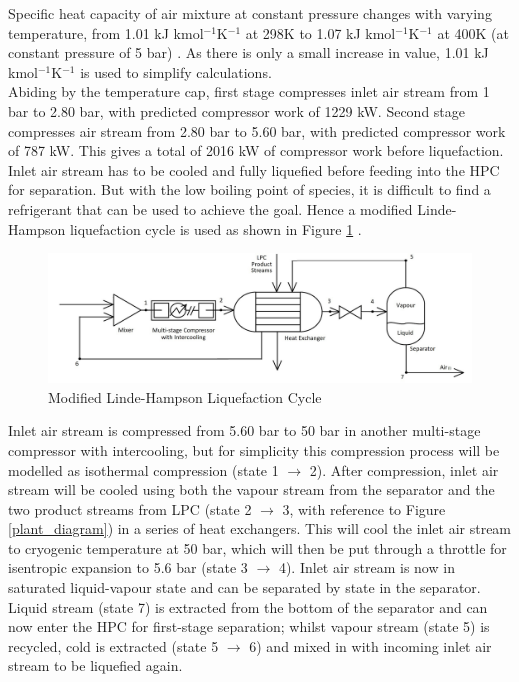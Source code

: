         Specific heat capacity of air mixture at constant pressure changes with varying temperature, from 1.01 kJ kmol$^{-1}$K$^{-1}$ at 298K to 1.07 kJ kmol$^{-1}$K$^{-1}$ at 400K (at constant pressure of 5 bar) \citep{engtoolbox_cp}. As there is only a small increase in value, 1.01 kJ kmol$^{-1}$K$^{-1}$ is used to simplify calculations. \\  
        Abiding by the temperature cap, first stage compresses inlet air stream from 1 bar to 2.80 bar, with predicted compressor work of 1229 kW. Second stage compresses air stream from 2.80 bar to 5.60 bar, with predicted compressor work of 787 kW. This gives a total of 2016 kW of compressor work before liquefaction.
         \label{sec:liquefaction_unit}
        Inlet air stream has to be cooled and fully liquefied before feeding into the HPC for separation. But with the low boiling point of species, it is difficult to find a refrigerant that can be used to achieve the goal. Hence a modified Linde-Hampson liquefaction cycle is used as shown in Figure \ref{labelled_liquefier_diagram} \citep{barron1985}. \\
        \begin{figure}[htp]
            \centering
            \includegraphics[scale=0.4]{airseparation/graphics/labelled_liquefier_diagram.jpg}
            \caption{Modified Linde-Hampson Liquefaction Cycle}
            \label{labelled_liquefier_diagram}
        \end{figure}
        \noindent Inlet air stream is compressed from 5.60 bar to 50 bar in another multi-stage compressor with intercooling, but for simplicity this compression process will be modelled as isothermal compression (state 1 $\rightarrow$ 2). After compression, inlet air stream will be cooled using both the vapour stream from the separator and the two product streams from LPC (state 2 $\rightarrow$ 3, with reference to Figure \ref{plant_diagram}) in a series of heat exchangers. This will cool the inlet air stream to cryogenic temperature at 50 bar, which will then be put through a throttle for isentropic expansion to 5.6 bar (state 3 $\rightarrow$ 4). Inlet air stream is now in saturated liquid-vapour state and can be separated by state in the separator. Liquid stream (state 7) is extracted from the bottom of the separator and can now enter the HPC for first-stage separation; whilst vapour stream (state 5) is recycled, cold is extracted (state 5 $\rightarrow$ 6) and mixed in with incoming inlet air stream to be liquefied again. \\
